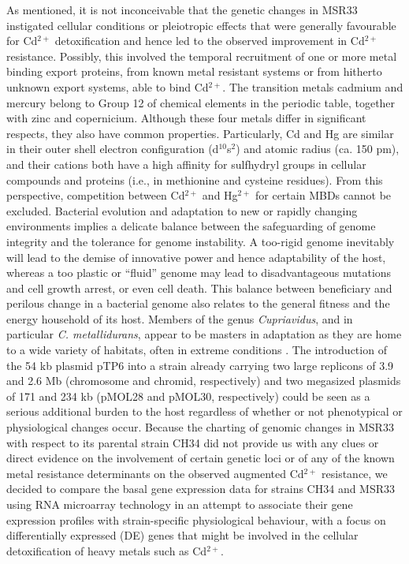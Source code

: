 As mentioned, it is not inconceivable that the genetic changes in MSR33 instigated cellular conditions or pleiotropic effects that were generally favourable for Cd$^{2+}$ detoxification and hence led to the observed improvement in Cd$^{2+}$ resistance. Possibly, this involved the temporal recruitment of one or more metal binding export proteins, from known metal resistant systems or from hitherto unknown export systems, able to bind Cd$^{2+}$. The transition metals cadmium and mercury belong to Group 12 of chemical elements in the periodic table, together with zinc and copernicium. Although these four metals differ in significant respects, they also have common properties. Particularly, Cd and Hg are similar in their outer shell electron configuration (d$^{10}$s$^2$) and atomic radius (ca. 150 pm), and their cations both have a high affinity for sulfhydryl groups in cellular compounds and proteins (i.e., in methionine and cysteine residues). From this perspective, competition between Cd$^{2+}$ and Hg$^{2+}$ for certain MBDs cannot be excluded. Bacterial evolution and adaptation to new or rapidly changing environments implies a delicate balance between the safeguarding of genome integrity and the tolerance for genome instability. A too-rigid genome inevitably will lead to the demise of innovative power and hence adaptability of the host, whereas a too plastic or “fluid” genome may lead to disadvantageous mutations and cell growth arrest, or even cell death. This balance between beneficiary and perilous change in a bacterial genome also relates to the general fitness and the energy household of its host. Members of the genus \textit{Cupriavidus}, and in particular \textit{C. metallidurans}, appear to be masters in adaptation as they are home to a wide variety of habitats, often in extreme conditions \citep{sota2007region,leys2009response,mijnendonckx2013characterization,byloos2017impact}. The introduction of the 54 kb plasmid pTP6 into a strain already carrying two large replicons of 3.9 and 2.6 Mb (chromosome and chromid, respectively) and two megasized plasmids of 171 and 234 kb (pMOL28 and pMOL30, respectively) could be seen as a serious additional burden to the host regardless of whether or not phenotypical or physiological changes occur.
Because the charting of genomic changes in MSR33 with respect to its parental strain CH34 did not provide us with any clues or direct evidence on the involvement of certain genetic loci or of any of the known metal resistance determinants on the observed augmented Cd$^{2+}$ resistance, we decided to compare the basal gene expression data for strains CH34 and MSR33 using RNA microarray technology in an attempt to associate their gene expression profiles with strain-specific physiological behaviour, with a focus on differentially expressed (DE) genes that might be involved in the cellular detoxification of heavy metals such as Cd$^{2+}$.


